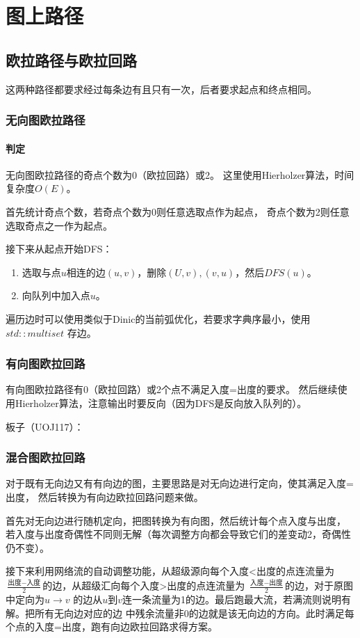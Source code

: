 \section{图上路径}
\subsection{欧拉路径与欧拉回路}
这两种路径都要求经过每条边有且只有一次，后者要求起点和终点相同。
\subsubsection{无向图欧拉路径}
\paragraph{判定} 无向图欧拉路径的奇点个数为0（欧拉回路）或2。
这里使用Hierholzer算法，时间复杂度$O(E)$。

首先统计奇点个数，若奇点个数为0则任意选取点作为起点，
奇点个数为2则任意选取奇点之一作为起点。

接下来从起点开始DFS：
\begin{enumerate}
    \item 选取与点$u$相连的边$(u,v)$，删除$(U,v),(v,u)$，然后$DFS(u)$。
    \item 向队列中加入点$u$。
\end{enumerate}
遍历边时可以使用类似于Dinic的当前弧优化，若要求字典序最小，使用$std::multiset$
存边。
\subsubsection{有向图欧拉回路}
有向图欧拉路径有0（欧拉回路）或2个点不满足入度=出度的要求。
然后继续使用Hierholzer算法，注意输出时要反向（因为DFS是反向放入队列的）。

板子（UOJ117）：

\subsubsection{混合图欧拉回路}
对于既有无向边又有有向边的图，主要思路是对无向边进行定向，使其满足入度=出度，
然后转换为有向边欧拉回路问题来做。

首先对无向边进行随机定向，把图转换为有向图，然后统计每个点入度与出度，
若入度与出度奇偶性不同则无解（每次调整方向都会导致它们的差变动2，奇偶性仍不变）。

接下来利用网络流的自动调整功能，从超级源向每个入度<出度的点连流量为
$\frac{\textrm{出度}-\textrm{入度}}{2}$的边，从超级汇向每个入度>出度的点连流量为
$\frac{\textrm{入度}-\textrm{出度}}{2}$的边，对于原图中定向为$u\rightarrow v$
的边从$u$到$v$连一条流量为1的边。最后跑最大流，若满流则说明有解。把所有无向边对应的边
中残余流量非0的边就是该无向边的方向。此时满足每个点的入度=出度，跑有向边欧拉回路求得方案。

